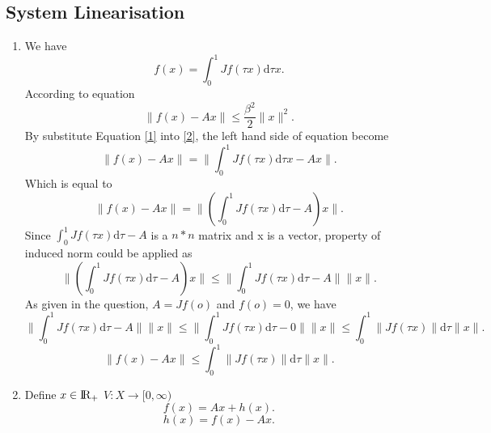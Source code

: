 \documentclass[a4paper,11pt,reqno]{amsart}
\newcommand{\R}{{\rm I\!R}}
\newcommand{\dd}{\mathrm{d}}
\begin{document}
\subsection{System Linearisation}
\begin{enumerate}
    \item 
        We have
            \begin{equation}
            \label{1}
                f(x) = \int_0^1 Jf(\tau x)\dd\tau x.
            \end{equation}
        According to equation 
            \begin{equation}
                \label{2}
                \|f(x)-Ax\| \leq \frac{\beta^2}{2} \|x\|^2.
            \end{equation}
        By substitute Equation \eqref{1} into \eqref{2}, the left hand side of equation become
            \begin{equation}
                \|f(x)-Ax\|= \|\int_0^1 Jf(\tau x)\dd\tau x-Ax\|.
            \end{equation}
        Which is equal to
            \begin{equation}
                \|f(x)-Ax\|= \|(\int_0^1 Jf(\tau x)\dd\tau-A)x\|.
            \end{equation}
        Since $\int_0^1 Jf(\tau x)\dd\tau-A$ is a $n*n$ matrix and x is a vector, property of induced norm could be applied as
            \begin{equation}
                \|(\int_0^1 Jf(\tau x)\dd\tau-A)x\| \leq \|\int_0^1 Jf(\tau x)\dd\tau-A\| \|x\|.
            \end{equation}
        As given in the question, $A=Jf(o)$ and $ f(o) = 0$, we have
            \begin{equation}
                \|\int_0^1 Jf(\tau x)\dd\tau-A\| \|x\| \leq \|\int_0^1 Jf(\tau x)\dd\tau-0\| \|x\| \leq \int_0^1 \|Jf(\tau x)\|\dd\tau \|x\|.
            \end{equation}
            \begin{equation}
                \|f(x) - Ax\| \leq \int_0^1 \|Jf(\tau x)\|\dd\tau \|x\|.
            \end{equation}
    \item Define $x \in \R_+$ $V:X \rightarrow [0,\infty)$ 
            \begin{equation}
                \label{3}
                f(x) = Ax + h(x).
            \end{equation}
            \begin{equation}
                h(x) = f(x) - Ax.

\end{equation}
\end{enumerate}
\end{document}
